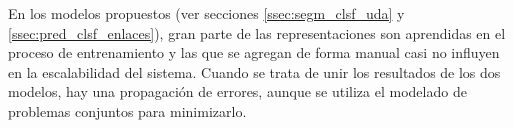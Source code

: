\documentclass[a4paper,11pt,twocolumn,twoside]{article}
\begin{document}




En los modelos propuestos (ver secciones \ref{ssec:segm_clsf_uda} y \ref{ssec:pred_clsf_enlaces}), gran parte de las representaciones son aprendidas en el proceso de 
entrenamiento y las que se agregan de forma manual casi no influyen en la escalabilidad del sistema.
Cuando se trata de unir los resultados de los dos modelos, hay una propagación de errores, 
aunque se utiliza el modelado de problemas conjuntos para minimizarlo.
\end{document}
